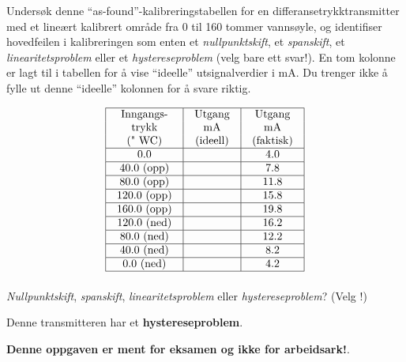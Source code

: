
Undersøk denne ``as-found''-kalibreringstabellen for en differansetrykktransmitter med et lineært kalibrert område fra 0 til 160 tommer vannsøyle, og identifiser hovedfeilen i kalibreringen som enten et \textit{nullpunktskift}, et \textit{spanskift}, et \textit{linearitetsproblem} eller et \textit{hystereseproblem} (velg bare ett svar!). En tom kolonne er lagt til i tabellen for å vise ``ideelle'' utsignalverdier i mA. Du trenger ikke å fylle ut denne ``ideelle'' kolonnen for å svare riktig.


$$\vbox{\offinterlineskip
\halign{\strut
\vrule \quad\hfil # \ \hfil & 
\vrule \quad\hfil # \ \hfil & 
\vrule \quad\hfil # \ \hfil \vrule \cr
\noalign{\hrule}
%
Inngangs- & Utgang & Utgang \cr
%
trykk & mA & mA \cr
%
(" WC) & (ideell) & (faktisk) \cr
%
\noalign{\hrule}
%
0.0 & & 4.0 \cr
%
\noalign{\hrule}
%
40.0 (opp) & & 7.8 \cr
%
\noalign{\hrule}
%
80.0 (opp) & & 11.8 \cr
%
\noalign{\hrule}
%
120.0 (opp) & & 15.8 \cr
%
\noalign{\hrule}
%
160.0 (opp) & & 19.8 \cr
%
\noalign{\hrule}
%
120.0 (ned) & & 16.2 \cr
%
\noalign{\hrule}
%
80.0 (ned) & & 12.2 \cr
%
\noalign{\hrule}
%
40.0 (ned) & & 8.2 \cr
%
\noalign{\hrule}
%
0.0 (ned) & & 4.2 \cr
%
\noalign{\hrule}
} %
}$$ %

\textit{Nullpunktskift}, \textit{spanskift}, \textit{linearitetsproblem} eller \textit{hystereseproblem}? (Velg !)







Denne transmitteren har et {\bf hystereseproblem}.







{\bf Denne oppgaven er ment for eksamen og ikke for arbeidsark!}.

